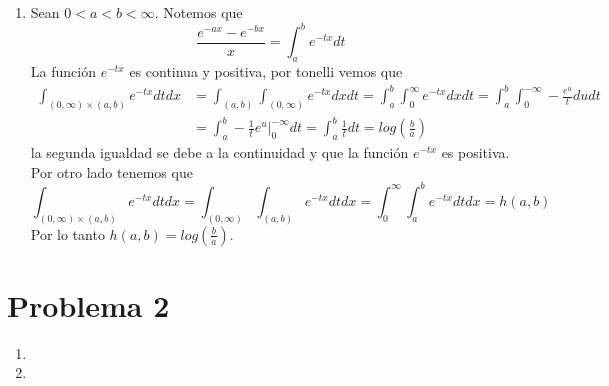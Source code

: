 \documentclass{article}
\begin{document}
\begin{enumerate}
    \item Sean $0<a<b<\infty$. Notemos que
    \begin{equation*}
        \frac{e^{-ax}-e^{-bx}}{x}=\int_{a}^{b}e^{-tx}dt
    \end{equation*}
    La función $e^{-tx}$ es continua y positiva, por tonelli vemos que
    \begin{align*}
        \int_{(0,\infty)\times(a,b)}e^{-tx}dtdx &= \int_{(a,b)}\int_{(0,\infty)}e^{-tx}dxdt
        =\int_{a}^{b}\int_{0}^{\infty}e^{-tx}dxdt=\int_{a}^{b}\int_{0}^{-\infty}-\frac{e^{u}}{t}
        dudt \\[2mm]
        &= \int_{a}^{b}-\frac{1}{t}e^{u}\Big|_{0}^{-\infty}dt=\int_{a}^{b}\frac{1}{t}dt
        =log\left(\frac{b}{a}\right)
    \end{align*}
    la segunda igualdad se debe a la continuidad y que la función $e^{-tx}$ es positiva. 
    Por otro lado tenemos que
    \begin{equation*}
        \int_{(0,\infty)\times(a,b)}e^{-tx}dtdx=\int_{(0,\infty)}\int_{(a,b)}e^{-tx}dtdx
        =\int_{0}^{\infty}\int_{a}^{b}e^{-tx}dtdx=h(a,b)
    \end{equation*}
    Por lo tanto $h(a,b)=log\left(\frac{b}{a}\right)$.
\end{enumerate}

\section*{Problema 2}
\begin{enumerate}
    \item 
    \item 
\end{enumerate}
\end{document}
